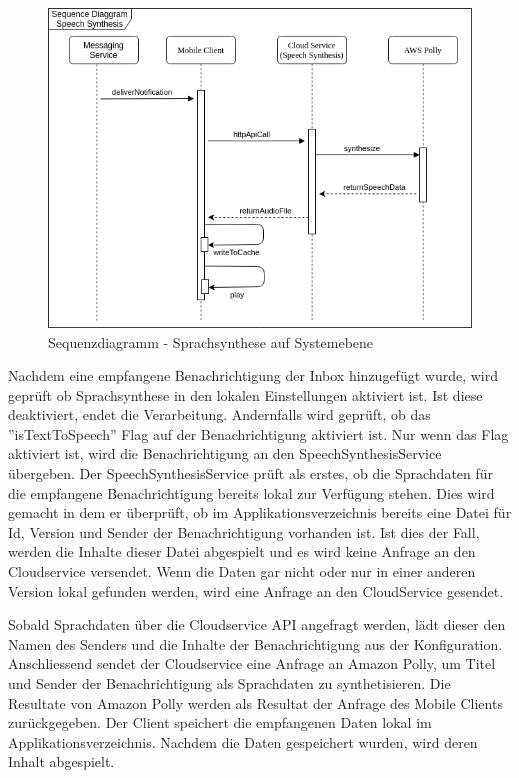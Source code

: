 \begin{figure}[h]
    \centering
    \begin{minipage}[b]{0.8\textwidth}
        \includegraphics[width=\textwidth]{graphics/diagramms/Sequence_Speech_Synth_System}
        \caption{Sequenzdiagramm - Sprachsynthese auf Systemebene}
    \end{minipage}
\end{figure}


Nachdem eine empfangene Benachrichtigung der Inbox hinzugefügt wurde, wird geprüft ob Sprachsynthese in den lokalen Einstellungen aktiviert ist.
Ist diese deaktiviert, endet die Verarbeitung.
Andernfalls wird geprüft, ob das ''isTextToSpeech'' Flag auf der Benachrichtigung aktiviert ist.
Nur wenn das Flag aktiviert ist, wird die Benachrichtigung an den SpeechSynthesisService übergeben.
Der SpeechSynthesisService prüft als erstes, ob die Sprachdaten für die empfangene Benachrichtigung bereits lokal zur Verfügung stehen.
Dies wird gemacht in dem er überprüft, ob im Applikationsverzeichnis bereits eine Datei für Id, Version und Sender der Benachrichtigung vorhanden ist.
Ist dies der Fall, werden die Inhalte dieser Datei abgespielt und es wird keine Anfrage an den Cloudservice versendet.
Wenn die Daten gar nicht oder nur in einer anderen Version lokal gefunden werden, wird eine Anfrage an den CloudService gesendet.

Sobald Sprachdaten über die Cloudservice API angefragt werden, lädt dieser den Namen des Senders und die Inhalte der Benachrichtigung aus der Konfiguration.
Anschliessend sendet der Cloudservice eine Anfrage an Amazon Polly, um Titel und Sender der Benachrichtigung als Sprachdaten zu synthetisieren.
Die Resultate von Amazon Polly werden als Resultat der Anfrage des Mobile Clients zurückgegeben.
Der Client speichert die empfangenen Daten lokal im Applikationsverzeichnis.
Nachdem die Daten gespeichert wurden, wird deren Inhalt abgespielt.

\clearpage

